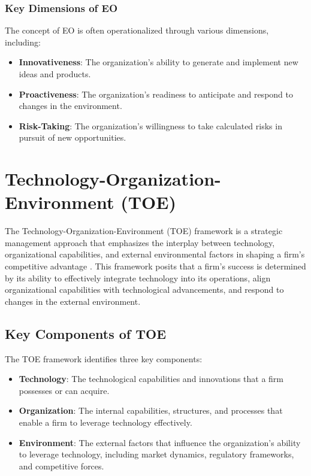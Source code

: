 \documentclass[../Main.tex]{subfiles}
\begin{document}
\subsubsection*{Key Dimensions of EO}
The concept of EO is often operationalized through various dimensions, including:
\begin{itemize}
    \item \textbf{Innovativeness}: The organization's ability to generate and implement new ideas and products.
    \item \textbf{Proactiveness}: The organization's readiness to anticipate and respond to changes in the environment.
    \item \textbf{Risk-Taking}: The organization's willingness to take calculated risks in pursuit of new opportunities.
\end{itemize}

\section{Technology-Organization-Environment (TOE)}
The Technology-Organization-Environment (TOE) framework is a strategic management approach that emphasizes the interplay between technology, organizational capabilities, and external environmental factors in shaping a firm's competitive advantage \cite{toer}. This framework posits that a firm's success is determined by its ability to effectively integrate technology into its operations, align organizational capabilities with technological advancements, and respond to changes in the external environment.

\subsection{Key Components of TOE}
The TOE framework identifies three key components:
\begin{itemize}
    \item \textbf{Technology}: The technological capabilities and innovations that a firm possesses or can acquire.
    \item \textbf{Organization}: The internal capabilities, structures, and processes that enable a firm to leverage technology effectively.
    \item \textbf{Environment}: The external factors that influence the organization's ability to leverage technology, including market dynamics, regulatory frameworks, and competitive forces.
\end{itemize}
\end{document}
